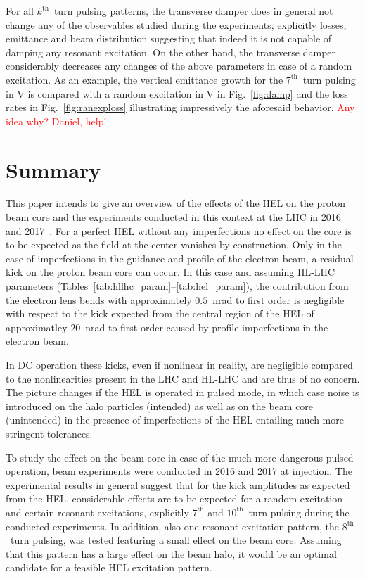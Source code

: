 \documentclass[%
 reprint,
 amsmath,amssymb,
 aps,
prstab,
]{revtex4-1}
\begin{document}
For all $k^{\mathrm{th}}$~turn pulsing patterns, the transverse damper does in general not change any of the observables studied during the experiments, explicitly losses, emittance and beam distribution suggesting that indeed it is not capable of damping any resonant excitation. On the other hand, the transverse damper considerably decreases any changes of the above parameters in case of a random excitation. As an example, the vertical emittance growth for the $7^{\mathrm{th}}$~turn pulsing in V  is compared with a random excitation in V in Fig.~\ref{fig:damp} and the loss rates in Fig.~\ref{fig:ranexploss} illustrating impressively the aforesaid behavior. 
\textcolor{red}{Any idea why? Daniel, help!}

\section{Summary\label{sec:sum}}
This paper intends to give an overview of the effects of the HEL on the proton beam core and the experiments conducted in this context at the LHC in 2016~\cite{resexmd2016} and 2017~\cite{resexmd2017}. For a perfect HEL without any imperfections no effect on the core is to be expected as the field at the center vanishes by construction. Only in the case of imperfections in the guidance and profile of the electron beam, a residual kick on the proton beam core can occur. In this case and assuming HL-LHC parameters (Tables~\ref{tab:hllhc_param}--\ref{tab:hel_param}), the contribution from the electron lens bends with approximately $0.5$~nrad to first order is negligible with respect to the kick expected from the central region of the HEL of approximatley $20$~nrad to first order caused by profile imperfections in the electron beam. 

In DC operation these kicks, even if nonlinear in reality, are negligible compared to the nonlinearities present in the LHC and HL-LHC and are thus of no concern. The picture changes if the HEL is operated in pulsed mode, in which case noise is introduced on the halo particles (intended) as well as on the beam core (unintended) in the presence of imperfections of the HEL entailing much more stringent tolerances.

To study the effect on the beam core in case of the much more dangerous pulsed operation, beam experiments were conducted in 2016 and 2017 at injection. The experimental results in general suggest that for the kick amplitudes as expected from the HEL, considerable effects are to be expected for a random excitation and certain resonant excitations, explicitly $7^{\mathrm{th}}$ and $10^{\mathrm{th}}$~turn pulsing during the conducted experiments. In addition, also one resonant excitation pattern, the $8^{\mathrm{th}}$~turn pulsing, was tested featuring a small effect on the beam core. Assuming that this pattern has a large effect on the beam halo, it would be an optimal candidate for a feasible HEL excitation pattern.
\end{document}
